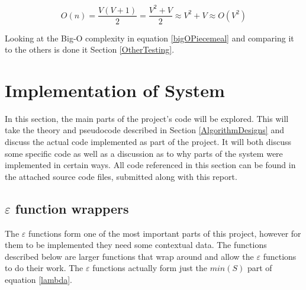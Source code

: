 \documentclass[12pt]{report}
\begin{document}
\begin{equation}\label{bigOPiecemeal}
	O(n) = \frac{V(V+1)}{2} = \frac{V^2 + V}{2} \approx V^2 + V \approx O(V^2)
\end{equation}

Looking at the Big-O complexity in equation \ref{bigOPiecemeal} and comparing it to the others is done it Section \ref{OtherTesting}.


\section{Implementation of System}\label{Implementation}
In this section, the main parts of the project's code will be explored. This will take the theory and pseudocode described in Section \ref{AlgorithmDesigns} and discuss the actual code implemented as part of the project. It will both discuss some specific code as well as a discussion as to why parts of the system were implemented in certain ways. All code referenced in this section can be found in the attached source code files, submitted along with this report.

\subsection{$\varepsilon$ function wrappers}\label{Imp-Ewrappers}
The $\varepsilon$ functions form one of the most important parts of this project, however for them to be implemented they need some contextual data. The functions described below are larger functions that wrap around and allow the $\varepsilon$ functions to do their work. The $\varepsilon$ functions actually form just the $min(S)$ part of equation \ref{lambda}. 
\end{document}
